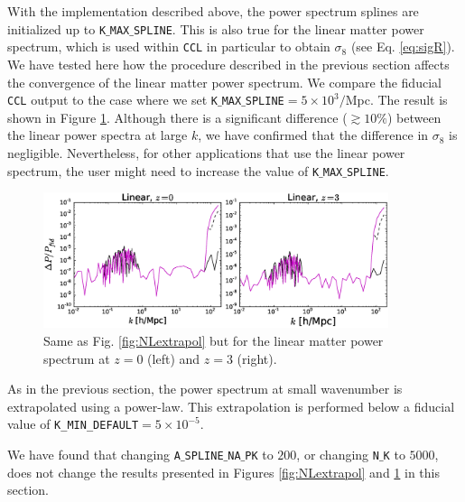 \documentclass[\docopts]{\docclass}
\newcommand{\ccl}{{\tt CCL}\xspace}
\begin{document}
With the implementation described above, the power spectrum splines are initialized up to {\tt K$\_$MAX$\_$SPLINE}. This is also true for the linear matter power spectrum, which is used within \ccl in particular to obtain $\sigma_8$ (see Eq. \ref{eq:sigR}). We have tested here how the procedure described in the previous section affects the convergence of the linear matter power spectrum. We compare the fiducial \ccl output to the case where we set {\tt K$\_$MAX$\_$SPLINE}$=5\times 10^3/$Mpc. The result is shown in Figure \ref{fig:Lextrapol}. Although there is a significant difference ($\gtrsim 10\%$) between the linear power spectra at large $k$, we have confirmed that the difference in $\sigma_8$ is negligible. Nevertheless, for other applications that use the linear power spectrum, the user might need to increase the value of {\tt K$\_$MAX$\_$SPLINE}.

\begin{figure}
\centering
\includegraphics[width=0.9\textwidth]{PS_converge_lin.eps}
\caption{Same as Fig. \ref{fig:NLextrapol} but for the linear matter power spectrum at $z=0$ (left) and $z=3$ (right).}
\label{fig:Lextrapol}
\end{figure}

As in the previous section, the power spectrum at small wavenumber is extrapolated using a power-law. This extrapolation is performed below a fiducial value of {\tt K\_MIN\_DEFAULT}$=5\times 10^{-5}$.

We have found that changing {\tt A$\_$SPLINE$\_$NA$\_$PK} to $200$, or changing {\tt N$\_$K} to $5000$, does not change the results presented in Figures \ref{fig:NLextrapol} and \ref{fig:Lextrapol} in this section.

\end{document}
